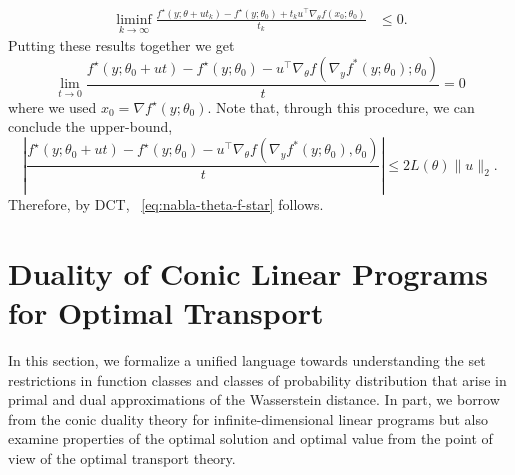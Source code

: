 \documentclass[10pt]{article}
\numberwithin{equation}{section}
\begin{document}
	\begin{align*}
	\liminf_{k \to \infty} \frac{f^\star(y ;\theta+ut_k) - f^\star(y;\theta_0) + t_ku^\top\nabla_\theta f(x_0;\theta_0)}{t_k} &\leq 0.
	\end{align*}
	Putting these results together we get
	\begin{equation*}
	\lim_{t \to 0} \frac{f^\star(y ;\theta_0+ut) - f^\star(y;\theta_0) - u^\top \nabla_\theta f(\nabla_y f^*(y;\theta_0);\theta_0)}{t}= 0
	\end{equation*}
	where we used $x_0=\nabla f^\star(y;\theta_0)$. Note that, through this procedure, we can conclude the upper-bound,
	\begin{equation*}
	| \frac{f^\star(y ;\theta_0+ut) - f^\star(y;\theta_0) - u^\top \nabla_\theta f(\nabla_y f^*(y;\theta_0),\theta_0)}{t}| \leq 2L(\theta)\|u\|_2.
	\end{equation*}
	Therefore, by DCT, ~\eqref{eq:nabla-theta-f-star} follows. 



\section{Duality of Conic Linear Programs for Optimal Transport}
\label{sec:restr-orig}
In this section, we formalize a unified language towards understanding the set restrictions in function classes and classes of probability distribution that arise in primal and dual approximations of the Wasserstein distance. In part, we borrow from the conic duality theory for infinite-dimensional linear programs but also examine properties of the optimal solution and optimal value from the point of view of the optimal transport theory. 
\end{document}
